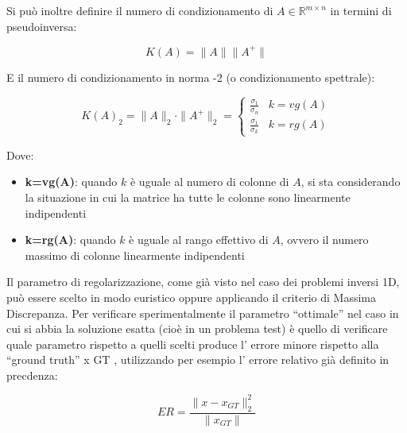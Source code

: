 Si può inoltre definire il numero di condizionamento di $A \in \mathbb{R}^{m\times n}$ in termini di pseudoinversa:

\[
    K(A)  = \|A\|\|A^+\|
\]
 
E il numero di condizionamento in norma -2 (o condizionamento spettrale):

\[
    K(A)_2 = \|A\|_2 \cdot \| A^+\|_2 = \begin{cases}
        \frac{\sigma_1}{\sigma_n} & k = vg (A) \\
        \frac{\sigma_1}{\sigma_k} & k = rg(A)
    \end{cases}
\]

Dove: 
\begin{itemize}
    \item \textbf{k=vg(A)}: quando $k$ è uguale al numero di colonne di $A$, si sta considerando la situazione in cui la matrice ha tutte le colonne sono linearmente indipendenti
    \item \textbf{k=rg(A)}: quando $k$ è uguale al rango effettivo di $A$, ovvero il numero massimo di colonne linearmente indipendenti
\end{itemize}

Il parametro di regolarizzazione, come già visto nel caso dei problemi inversi 1D, può
essere scelto in modo euristico oppure applicando il criterio di Massima Discrepanza.
Per verificare sperimentalmente il parametro “ottimale” nel caso in cui si abbia la
soluzione esatta (cioè in un problema test) è quello di verificare quale parametro
rispetto a quelli scelti produce l’ errore minore rispetto alla “ground truth” x GT ,
utilizzando per esempio l’ errore relativo già definito in precdenza:

\[
    ER = \frac{\|x-x_{GT}\|_2^2}{\|x_{GT}\|}    
\]

